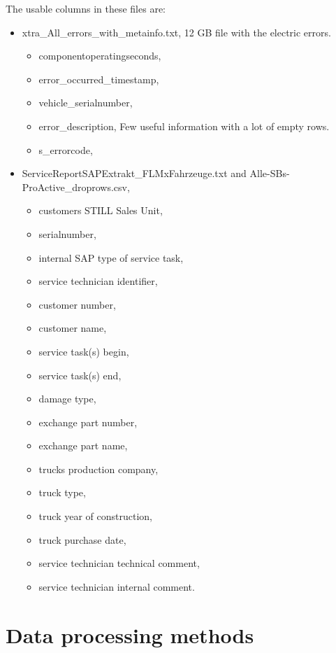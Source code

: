 The usable columns in these files are:
\begin{itemize}[noitemsep]
	\item{xtra\_All\_errors\_with\_metainfo.txt,} 12 GB file with the electric errors.
	\begin{itemize}[noitemsep]
		\item{componentoperatingseconds,}
		\item{error\_occurred\_timestamp,}
		\item{vehicle\_serialnumber,}
		\item{error\_description,} Few useful information with a lot of empty rows.
		\item{s\_errorcode,}
	\end{itemize}
	\item{ServiceReportSAPExtrakt\_FLMxFahrzeuge.txt and Alle-SBs-ProActive\_droprows.csv,}
	\begin{itemize}[noitemsep]
		\item{customers STILL Sales Unit,}
		\item{serialnumber,}
		\item{internal SAP type of service task,}
		\item{service technician identifier,}
		\item{customer number,}
		\item{customer name,}
		\item{service task(s) begin},
		\item{service task(s) end,}
		\item{damage type,}
		\item{exchange part number,}
		\item{exchange part name,}
		\item{trucks production company},
		\item{truck type,}
		\item{truck year of construction,}
		\item{truck purchase date,}
		\item{service technician technical comment,}
		\item{service technician internal comment.}
	\end{itemize}
\end{itemize}
	\section{Data processing methods}
